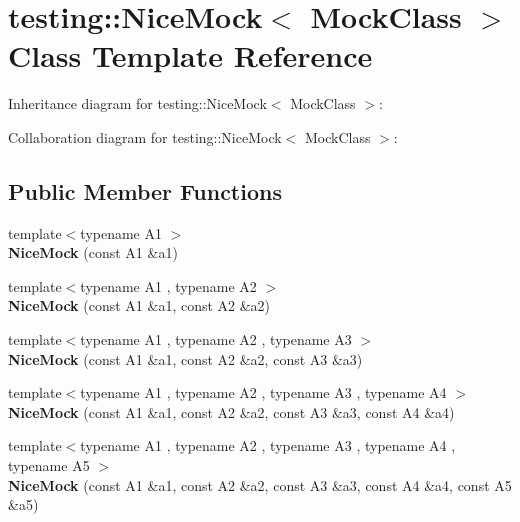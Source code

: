 \hypertarget{classtesting_1_1NiceMock}{}\section{testing\+:\+:Nice\+Mock$<$ Mock\+Class $>$ Class Template Reference}
\label{classtesting_1_1NiceMock}


Inheritance diagram for testing\+:\+:Nice\+Mock$<$ Mock\+Class $>$\+:


Collaboration diagram for testing\+:\+:Nice\+Mock$<$ Mock\+Class $>$\+:
\subsection*{Public Member Functions}
\begin{DoxyCompactItemize}
\item 
\mbox{\label{classtesting_1_1NiceMock_a2d6b9cb9d929d1af4532b69c7ef19df6}} 
{\footnotesize template$<$typename A1 $>$ }\\{\bfseries Nice\+Mock} (const A1 \&a1)
\item 
\mbox{\label{classtesting_1_1NiceMock_a150837476e88f52772c8f85180b889a1}} 
{\footnotesize template$<$typename A1 , typename A2 $>$ }\\{\bfseries Nice\+Mock} (const A1 \&a1, const A2 \&a2)
\item 
\mbox{\label{classtesting_1_1NiceMock_a0b91bd74b497626bb81d07c3d4b59d22}} 
{\footnotesize template$<$typename A1 , typename A2 , typename A3 $>$ }\\{\bfseries Nice\+Mock} (const A1 \&a1, const A2 \&a2, const A3 \&a3)
\item 
\mbox{\label{classtesting_1_1NiceMock_a5ffbe1a648f16612266d4e67a2d063d1}} 
{\footnotesize template$<$typename A1 , typename A2 , typename A3 , typename A4 $>$ }\\{\bfseries Nice\+Mock} (const A1 \&a1, const A2 \&a2, const A3 \&a3, const A4 \&a4)
\item 
\mbox{\label{classtesting_1_1NiceMock_a3812c0ba0d743f9a0c3d276dfc076f4c}} 
{\footnotesize template$<$typename A1 , typename A2 , typename A3 , typename A4 , typename A5 $>$ }\\{\bfseries Nice\+Mock} (const A1 \&a1, const A2 \&a2, const A3 \&a3, const A4 \&a4, const A5 \&a5)

\end{DoxyCompactItemize}

